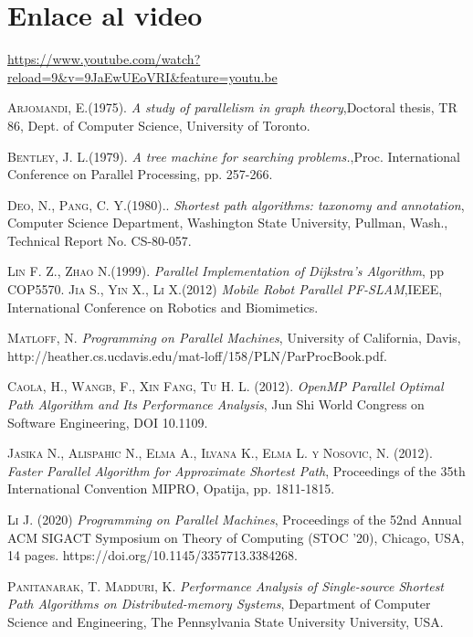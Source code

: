 \documentclass[11pt]{article}
\begin{document}
\section{Enlace al video}
\par
\url{https://www.youtube.com/watch?reload=9&v=9JaEwUEoVRI&feature=youtu.be}

\begin{thebibliography}{x}
  \textsc{Arjomandi, E.(1975).}
 \textit{A study of parallelism in graph theory},Doctoral thesis, TR 86, Dept. of Computer Science, University of Toronto.
 
  \textsc{Bentley, J. L.(1979).}
 	\textit{A tree machine for searching problems.},Proc. International Conference on Parallel Processing, pp. 257-266. 	
 
   \textsc{Deo, N., Pang, C. Y.(1980).}. \textit{Shortest path algorithms: taxonomy and annotation}, Computer Science Department, Washington State University, Pullman, Wash., Technical Report No. CS-80-057.
 	
 	  \textsc{Lin F. Z., Zhao N.(1999).} 
 	\textit{Parallel Implementation of Dijkstra's Algorithm}, pp COP5570.	   
  \textsc{Jia S., Yin X., Li X.(2012)}
 \textit{Mobile Robot Parallel PF-SLAM},IEEE, International Conference on Robotics and Biomimetics.  

  \textsc{Matloff, N.} 
 	\textit{Programming on Parallel Machines}, University of California, Davis, http://heather.cs.ucdavis.edu/mat-loff/158/PLN/ParProcBook.pdf.
 
  \textsc{Caola, H., Wangb, F., Xin Fang, Tu H. L. (2012).} 
 	\textit{OpenMP Parallel Optimal Path Algorithm and Its Performance Analysis}, Jun Shi World Congress on Software Engineering, DOI 10.1109.
 	
  \textsc{Jasika N., Alispahic N., Elma A., Ilvana K., Elma L. y Nosovic, N. (2012).} 
 	\textit{Faster Parallel Algorithm for Approximate Shortest Path}, Proceedings of the 35th International Convention MIPRO, Opatija, pp. 1811-1815.
 	
  \textsc{Li J. (2020)} 
 	\textit{Programming on Parallel Machines}, Proceedings of the 52nd Annual ACM SIGACT Symposium on Theory of Computing (STOC ’20), Chicago,  USA, 14 pages. https://doi.org/10.1145/3357713.3384268.

  \textsc{Panitanarak, T. Madduri, K.} 
 	\textit{Performance Analysis of Single-source Shortest Path Algorithms on Distributed-memory Systems}, Department of Computer Science and Engineering, The Pennsylvania State University
University, USA.


\end{thebibliography}
\end{document}

